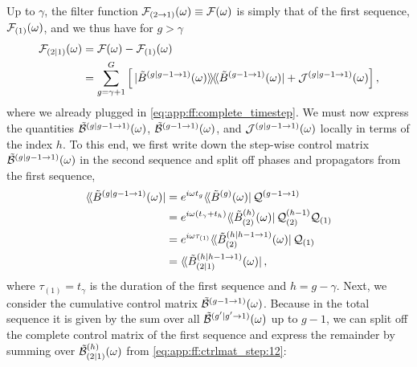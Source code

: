 Up to $\gamma$, the filter function $\mathcal{F}_{(2\to 1)}(\omega)\equiv \mathcal{F}(\omega)$ is simply that of the first sequence, $\mathcal{F}_{(1)}(\omega)$, and we thus have for $g>\gamma$
\begin{align}
    \FF_{(2|1)}(\omega) &= \FF(\omega) - \FF_{(1)}(\omega) \notag \\
                        &= \sum_{g=\gamma+1}^{G}\left[
                            \dop*{\Bt\gth{g|g-1\to 1}(\omega)}{\Bt\gth{g-1\to 1}(\omega)} + \mc{J}\gth{g|g-1\to 1}(\omega)
                        \right],\label{eq:app:ff:filter_function:12:2}
\end{align}
where we already plugged in \cref{eq:app:ff:complete_timestep}.
We must now express the quantities $\tilde{\mathcal{B}}^{(g|g-1\to 1)}(\omega)$, $\tilde{\mathcal{B}}^{(g-1\to 1)}(\omega)$, and $\mathcal{J}^{(g|g-1\to 1)}(\omega)$ locally in terms of the index $h$.
To this end, we first write down the step-wise control matrix $\tilde{\mathcal{B}}^{(g|g-1\to 1)}(\omega)$ in the second sequence and split off phases and propagators from the first sequence,
\begin{align}\label{eq:app:ff:ctrlmat_step:12}
    \dbra*{\Bt\gth{g|g-1\to 1}(\omega)} &= \e^{\i\omega t_{g}}\dbra*{\Bt\gth{g}(\omega)}\liouvQ\gth{g-1\to 1} \notag \\
                                        &= \e^{\i\omega (t_\gamma + t_{h})}\dbra*{\Bt_{(2)}\gth{h}(\omega)}\liouvQ_{(2)}\gth{h-1}\liouvQ_{(1)} \notag \\
                                        &= \e^{\i\omega\tau_{(1)}}\dbra*{\Bt_{(2)}\gth{h|h-1\to 1}(\omega)}\liouvQ_{(1)} \notag \\
                                        &= \dbra*{\Bt_{(2|1)}\gth{h|h-1\to 1}(\omega)},
\end{align}
where $\tau_{(1)}=t_{\gamma}$ is the duration of the first sequence and $h = g - \gamma$.
Next, we consider the cumulative control matrix $\tilde{\mathcal{B}}^{(g-1\to 1)}(\omega)$.
Because in the total sequence it is given by the sum over all $\tilde{\mathcal{B}}^{(g^{\prime}|g^{\prime}\to 1)}(\omega)$ up to $g-1$, we can split off the complete control matrix of the first sequence and express the remainder by summing over $\tilde{\mathcal{B}}^{(h)}_{(2|1)}(\omega)$ from \cref{eq:app:ff:ctrlmat_step:12}:
